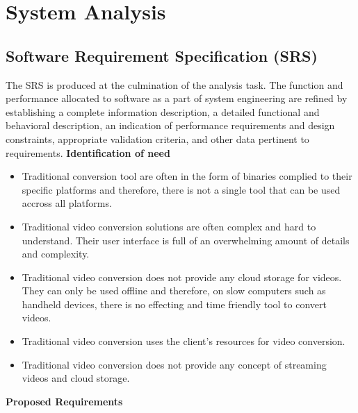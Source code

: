 \section{System Analysis}
		\vs
			\subsection{Software Requirement Specification (SRS)}
			\vs
			\hspace{1cm}The SRS is produced at the culmination of the analysis task. The function and performance allocated
			to software as a part of system engineering are refined by establishing a complete information
			description, a detailed functional and behavioral description, an indication of performance
			requirements and design constraints, appropriate validation criteria, and other data pertinent to
			requirements.
			\vs
			\large\textbf{Identification of need}
			\begin{itemize}
				\item Traditional conversion tool are often in the form of binaries complied to their specific platforms and therefore, there is not a single tool that can be used accross all platforms.
				\item Traditional video conversion solutions are often complex and hard to understand. Their user interface is full of an overwhelming amount of details and complexity.
				\item Traditional video conversion does not provide any cloud storage for videos. They can only be used offline and therefore, on slow computers such as handheld devices, there is no effecting and time friendly tool to convert videos.
				\item Traditional video conversion uses the client’s resources for video conversion.
				\item Traditional video conversion does not provide any concept of streaming videos and cloud storage.
			\end{itemize}
			\vs
			\large\textbf{Proposed Requirements}
				\vs
